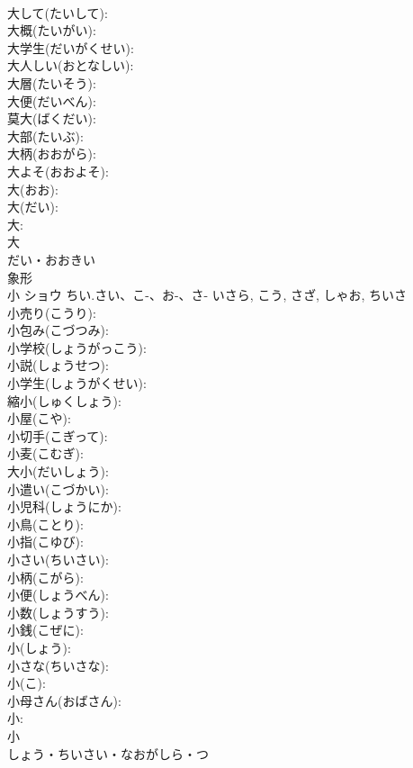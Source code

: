 \documentclass[8pt]{extreport}
\begin{document}
\begin{CJK}{UTF8}{min}
\\	大して(たいして): 
\\	大概(たいがい): 
\\	大学生(だいがくせい): 
\\	大人しい(おとなしい): 
\\	大層(たいそう): 
\\	大便(だいべん): 
\\	莫大(ばくだい): 
\\	大部(たいぶ): 
\\	大柄(おおがら): 
\\	大よそ(おおよそ): 
\\	大(おお): 
\\	大(だい): 
\\	大: 
\\	大	
\\	だい・おおきい	
\\	象形 
\\	小	ショウ	ちい.さい、こ-、お-、さ-	いさら, こう, さざ, しゃお, ちいさ	
\\	小売り(こうり): 
\\	小包み(こづつみ): 
\\	小学校(しょうがっこう): 
\\	小説(しょうせつ): 
\\	小学生(しょうがくせい): 
\\	縮小(しゅくしょう): 
\\	小屋(こや): 
\\	小切手(こぎって): 
\\	小麦(こむぎ): 
\\	大小(だいしょう): 
\\	小遣い(こづかい): 
\\	小児科(しょうにか): 
\\	小鳥(ことり): 
\\	小指(こゆび): 
\\	小さい(ちいさい): 
\\	小柄(こがら): 
\\	小便(しょうべん): 
\\	小数(しょうすう): 
\\	小銭(こぜに): 
\\	小(しょう): 
\\	小さな(ちいさな): 
\\	小(こ): 
\\	小母さん(おばさん): 
\\	小: 
\\	小	
\\	しょう・ちいさい・なおがしら・つ	

\end{CJK}
\end{document}
